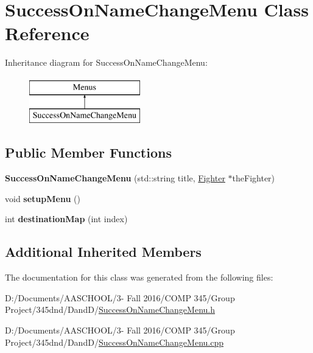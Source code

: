 \hypertarget{class_success_on_name_change_menu}{}\section{Success\+On\+Name\+Change\+Menu Class Reference}
\label{class_success_on_name_change_menu}
Inheritance diagram for Success\+On\+Name\+Change\+Menu\+:\begin{figure}[H]
\begin{center}
\leavevmode
\includegraphics[height=2.000000cm]{class_success_on_name_change_menu}
\end{center}
\end{figure}
\subsection*{Public Member Functions}
\begin{DoxyCompactItemize}
\item 
\hypertarget{class_success_on_name_change_menu_afa2f230aaca3eb5316a76db90545af2b}{}\label{class_success_on_name_change_menu_afa2f230aaca3eb5316a76db90545af2b} 
{\bfseries Success\+On\+Name\+Change\+Menu} (std\+::string title, \hyperlink{class_fighter}{Fighter} $\ast$the\+Fighter)
\item 
\hypertarget{class_success_on_name_change_menu_a3466f8b401936405911a0bde10c56ad1}{}\label{class_success_on_name_change_menu_a3466f8b401936405911a0bde10c56ad1} 
void {\bfseries setup\+Menu} ()
\item 
\hypertarget{class_success_on_name_change_menu_a466edb0c3ca67a19c3bd64bf2e8020b4}{}\label{class_success_on_name_change_menu_a466edb0c3ca67a19c3bd64bf2e8020b4} 
int {\bfseries destination\+Map} (int index)
\end{DoxyCompactItemize}
\subsection*{Additional Inherited Members}


The documentation for this class was generated from the following files\+:\begin{DoxyCompactItemize}
\item 
D\+:/\+Documents/\+A\+A\+S\+C\+H\+O\+O\+L/3-\/ Fall 2016/\+C\+O\+M\+P 345/\+Group Project/345dnd/\+Dand\+D/\hyperlink{_success_on_name_change_menu_8h}{Success\+On\+Name\+Change\+Menu.\+h}\item 
D\+:/\+Documents/\+A\+A\+S\+C\+H\+O\+O\+L/3-\/ Fall 2016/\+C\+O\+M\+P 345/\+Group Project/345dnd/\+Dand\+D/\hyperlink{_success_on_name_change_menu_8cpp}{Success\+On\+Name\+Change\+Menu.\+cpp}\end{DoxyCompactItemize}
